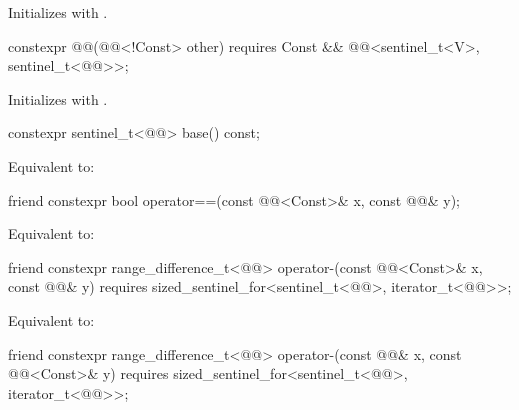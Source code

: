 \documentclass{wg21}
\begin{document}
\begin{itemdescr}
    \pnum
    \effects
    Initializes  with .
\end{itemdescr}

\begin{itemdecl}
    constexpr @@(@@<!Const> other)
    requires Const && @@<sentinel_t<V>, sentinel_t<@@>>;
\end{itemdecl}

\begin{itemdescr}
    \pnum
    \effects
    Initializes  with .
\end{itemdescr}

\begin{itemdecl}
    constexpr sentinel_t<@@> base() const;
\end{itemdecl}

\begin{itemdescr}
    \pnum
    \effects
    Equivalent to: 
\end{itemdescr}

\begin{itemdecl}
    friend constexpr bool operator==(const @@<Const>& x, const @@& y);
\end{itemdecl}

\begin{itemdescr}
    \pnum
    \effects
    Equivalent to: 
\end{itemdescr}

\begin{itemdecl}
    friend constexpr range_difference_t<@@>
    operator-(const @@<Const>& x, const @@& y)
    requires sized_sentinel_for<sentinel_t<@@>, iterator_t<@@>>;
\end{itemdecl}

\begin{itemdescr}
    \pnum
    \effects
    Equivalent to: 
\end{itemdescr}

\begin{itemdecl}
    friend constexpr range_difference_t<@@>
    operator-(const @@& x, const @@<Const>& y)
    requires sized_sentinel_for<sentinel_t<@@>, iterator_t<@@>>;
\end{itemdecl}
\end{document}
